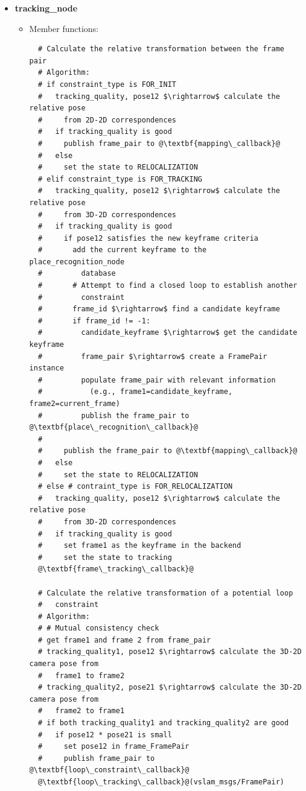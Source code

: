 \begin{itemize}
  \item \textbf{tracking\_node}
  \begin{itemize}
    \item Member functions:
\begin{lstlisting}
  # Calculate the relative transformation between the frame pair
  # Algorithm:
  # if constraint_type is FOR_INIT
  #   tracking_quality, pose12 $\rightarrow$ calculate the relative pose 
  #     from 2D-2D correspondences
  #   if tracking_quality is good
  #     publish frame_pair to @\textbf{mapping\_callback}@
  #   else
  #     set the state to RELOCALIZATION
  # elif constraint_type is FOR_TRACKING
  #   tracking_quality, pose12 $\rightarrow$ calculate the relative pose 
  #     from 3D-2D correspondences
  #   if tracking_quality is good
  #     if pose12 satisfies the new keyframe criteria
  #       add the current keyframe to the place_recognition_node  
  #         database 
  #       # Attempt to find a closed loop to establish another 
  #         constraint
  #       frame_id $\rightarrow$ find a candidate keyframe
  #       if frame_id != -1:
  #         candidate_keyframe $\rightarrow$ get the candidate keyframe
  #         frame_pair $\rightarrow$ create a FramePair instance
  #         populate frame_pair with relevant information 
  #           (e.g., frame1=candidate_keyframe, frame2=current_frame)
  #         publish the frame_pair to @\textbf{place\_recognition\_callback}@
  #     
  #     publish the frame_pair to @\textbf{mapping\_callback}@
  #   else
  #     set the state to RELOCALIZATION
  # else # contraint_type is FOR_RELOCALIZATION
  #   tracking_quality, pose12 $\rightarrow$ calculate the relative pose 
  #     from 3D-2D correspondences
  #   if tracking_quality is good
  #     set frame1 as the keyframe in the backend
  #     set the state to tracking
  @\textbf{frame\_tracking\_callback}@

  # Calculate the relative transformation of a potential loop 
  #   constraint
  # Algorithm:
  # # Mutual consistency check 
  # get frame1 and frame 2 from frame_pair
  # tracking_quality1, pose12 $\rightarrow$ calculate the 3D-2D camera pose from 
  #   frame1 to frame2
  # tracking_quality2, pose21 $\rightarrow$ calculate the 3D-2D camera pose from 
  #   frame2 to frame1
  # if both tracking_quality1 and tracking_quality2 are good
  #   if pose12 * pose21 is small
  #     set pose12 in frame_FramePair
  #     publish frame_pair to @\textbf{loop\_constraint\_callback}@
  @\textbf{loop\_tracking\_callback}@(vslam_msgs/FramePair)


\end{lstlisting}
\end{itemize}
\end{itemize}
